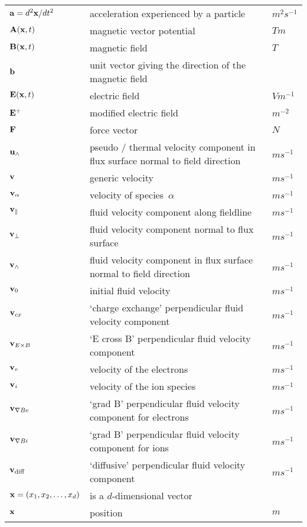 \begin{longtable}{|p{3.0cm}|p{10.0cm}|p{3.0cm}|}
${\bf a} = d^2 {\bf x}/dt^2$ & acceleration experienced by a particle  &  $m^2 s^{-1}$ \\
${\bf A}({\bf x},t)$ & magnetic vector potential   &  $T m$ \\
${\bf B}({\bf x},t)$ & magnetic field  &  $T$ \\
${\bf b}$ & unit vector giving the direction of the magnetic field & \\
${\bf E}({\bf x},t)$ & electric field  &  $V m^{-1}$ \\
${\bf E}^{+}$ & modified electric field  &  $m^{-2}$ \\
${\bf F}$ & force vector  &  $N$ \\
${\bf u}_\wedge$ & pseudo / thermal velocity component in flux surface normal to field direction  &  $m s^{-1}$ \\
${\bf v}$ & generic velocity  &  $m s^{-1}$ \\
${\bf v}_\alpha$ & velocity of species~$\alpha$  &  $m s^{-1}$ \\
${\bf v}_{\|}$ & fluid velocity component along fieldline  &  $m s^{-1}$ \\
${\bf v}_\perp$ & fluid velocity component normal to flux surface  &  $m s^{-1}$ \\
${\bf v}_\wedge$ & fluid velocity component in flux surface normal to field direction  &  $m s^{-1}$ \\
${\bf v}_0$ & initial fluid velocity  &  $m s^{-1}$ \\
${\bf v}_{cx}$ & `charge exchange' perpendicular fluid velocity component  &  $m s^{-1}$ \\
${\bf v}_{E \times B}$ & `E cross B' perpendicular fluid velocity component  &  $m s^{-1}$ \\
${\bf v}_e$ & velocity of the electrons  &  $m s^{-1}$ \\
${\bf v}_i$ & velocity of the ion species  &  $m s^{-1}$ \\
${\bf v}_{\nabla B e}$ & `grad B' perpendicular fluid velocity component for electrons  &  $m s^{-1}$ \\
${\bf v}_{\nabla B i}$ & `grad B' perpendicular fluid velocity component for ions  &  $m s^{-1}$ \\
${\bf v}_\textrm{diff}$ & `diffusive' perpendicular fluid velocity component  &  $m s^{-1}$ \\
${\bf x}=\left(x_1,x_2,\dots,x_d\right)$ & is a $d$-dimensional vector  & \\
${\bf x}$ & position  &  $m$ \\

\end{longtable}
